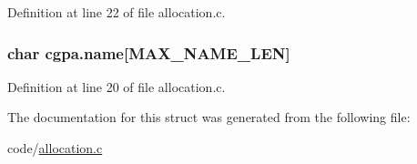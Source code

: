 Definition at line 22 of file allocation.c.

\hypertarget{structcgpa_a4d971d968022affbe8670220fea9c34b}{
\subsubsection[{name}]{\setlength{\rightskip}{0pt plus 5cm}char {\bf cgpa.name}\mbox{[}MAX\_\-NAME\_\-LEN\mbox{]}}}
\label{structcgpa_a4d971d968022affbe8670220fea9c34b}


Definition at line 20 of file allocation.c.



The documentation for this struct was generated from the following file:\begin{DoxyCompactItemize}
\item 
code/\hyperlink{allocation_8c}{allocation.c}\end{DoxyCompactItemize}
